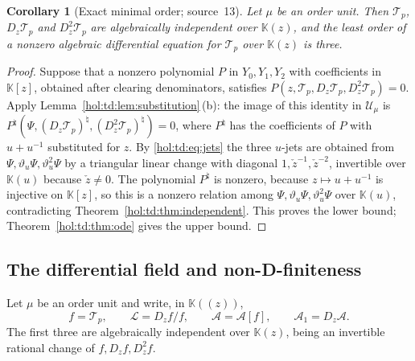 \documentclass[11pt]{article}
\numberwithin{equation}{section}
\newtheorem{corollary}[theorem]{Corollary}
\theoremstyle{definition}
\theoremstyle{remark}
\newcommand{\KK}{\mathbb K}
\begin{document}
\begin{corollary}[Exact minimal order; source~13]\label{hol:td:cor:order}
Let $\mu$ be an order unit. Then $\mathcal T_p$, $D_z\mathcal T_p$ and
$D_z^2\mathcal T_p$ are algebraically independent over $\KK(z)$, and the least
order of a nonzero algebraic differential equation for $\mathcal T_p$ over
$\KK(z)$ is three.
\end{corollary}

\begin{proof}
Suppose that a nonzero polynomial $P$ in $Y_0,Y_1,Y_2$ with coefficients in
$\KK[z]$, obtained after clearing denominators, satisfies
$P(z,\mathcal T_p,D_z\mathcal T_p,D_z^2\mathcal T_p)=0$. Apply
Lemma~\ref{hol:td:lem:substitution}\,(b): the image of this identity in
$\mathcal U_\mu$ is $P^\natural(\Psi,(D_z\mathcal T_p)^\natural,(D_z^2\mathcal
T_p)^\natural)=0$, where $P^\natural$ has the coefficients of $P$ with
$u+u^{-1}$ substituted for $z$. By \eqref{hol:td:eq:jets} the three $u$-jets
are obtained from $\Psi,\vartheta_u\Psi,\vartheta_u^2\Psi$ by a triangular
linear change with diagonal $1,\check z^{-1},\check z^{-2}$, invertible over
$\KK(u)$ because $\check z\ne0$. The polynomial $P^\natural$ is nonzero,
because $z\mapsto u+u^{-1}$ is injective on $\KK[z]$, so this is a nonzero
relation among $\Psi,\vartheta_u\Psi,\vartheta_u^2\Psi$ over $\KK(u)$,
contradicting Theorem~\ref{hol:td:thm:independent}. This proves the lower
bound; Theorem~\ref{hol:td:thm:ode} gives the upper bound.
\end{proof}

\subsection{The differential field and non-D-finiteness}\label{hol:td:sub:field}

Let $\mu$ be an order unit and write, in $\KK((z))$,
\[
 f=\mathcal T_p,\qquad \mathcal L=D_zf/f,\qquad \mathcal A=\mathcal A[f],\qquad
 \mathcal A_1=D_z\mathcal A .
\]
The first three are algebraically independent over $\KK(z)$, being an
invertible rational change of $f,D_zf,D_z^2f$.
\end{document}
